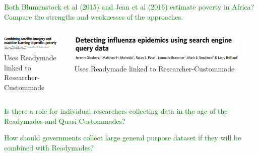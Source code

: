 \documentclass[aspectratio=169]{beamer}
\begin{document}
\begin{frame}

\textcolor{green}{Both Blumenstock et al (2015) and Jean et al (2016) estimate poverty in Africa?  Compare the strengths and weaknesses of the approaches.}

\end{frame}
\begin{frame}

\begin{columns}

\begin{column}{0.5\textwidth}  
\begin{center}
\includegraphics[width=0.9\textwidth]{figures/jean_combining_2016_title}\\
Uses Readymade linked to Researcher-Custommade
\end{center}
\end{column}
\begin{column}{0.5\textwidth}
\begin{center}
\includegraphics[width=0.9\textwidth]{figures/ginsberg_detecting_2009_title}\\
Uses Readymade linked to Researcher-Custommade
\end{center}
\end{column}
\end{columns}

\end{frame}
\begin{frame}

\textcolor{green}{Is there a role for individual researchers collecting data in the age of the Readymades and Quasi Custommades?}

\end{frame}
\begin{frame}

\textcolor{green}{How should governments collect large general purpose dataset if they will be combined with Readymades?}

\end{frame}
\end{document}
